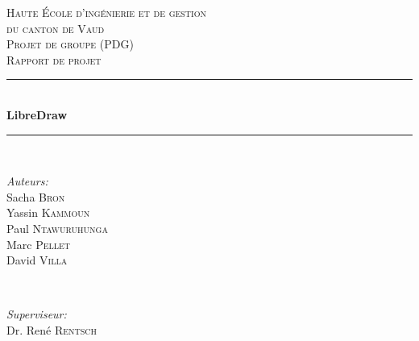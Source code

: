 \documentclass[11pt,a4paper,oldfontcommands]{memoir}
\begin{document}
\begin{titlepage}

\newcommand{\HRule}{\rule{\linewidth}{0.5mm}}

\center
 

\textsc{\LARGE Haute École d'ingénierie et de gestion \\du canton de Vaud}\\[1.5cm]
\textsc{\Large Projet de groupe (PDG)}\\[0.5cm]
\textsc{\large Rapport de projet}\\[0.5cm]


\HRule \\[0.8cm]
{ \huge \bfseries LibreDraw}\\[0.4cm]
\HRule \\[1.5cm]
 

\begin{minipage}{0.4\textwidth}
\begin{flushleft} \large
\emph{Auteurs:}\\
Sacha \textsc{Bron}\\
Yassin \textsc{Kammoun}\\
Paul \textsc{Ntawuruhunga}\\
Marc \textsc{Pellet}\\
David \textsc{Villa}
\end{flushleft}
\end{minipage}
~
\begin{minipage}{0.4\textwidth}
\begin{flushright} \large
\emph{Superviseur:} \\
Dr. René \textsc{Rentsch} 
\break 
\break 
\break 
\break 
\end{flushright}
\end{minipage}\\[4cm]


\end{titlepage}
\end{document}
